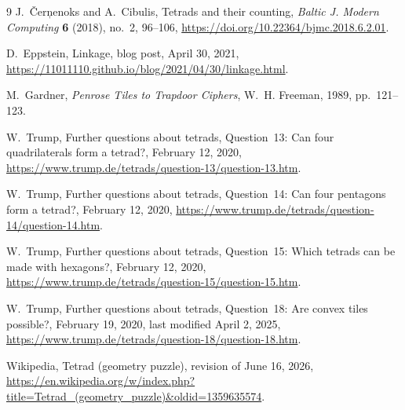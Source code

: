 \documentclass[11pt]{article}
\theoremstyle{definition}
\theoremstyle{remark}
\begin{document}
\begin{thebibliography}{9}
 J.~\v{C}er\c{n}enoks and A.~Cibulis, Tetrads and their
counting, \emph{Baltic J. Modern Computing} \textbf{6} (2018), no.~2,
96--106, \url{https://doi.org/10.22364/bjmc.2018.6.2.01}.

 D.~Eppstein, Linkage, blog post, April 30, 2021,
\url{https://11011110.github.io/blog/2021/04/30/linkage.html}.

 M.~Gardner, \emph{Penrose Tiles to Trapdoor Ciphers},
W.~H. Freeman, 1989, pp.~121--123.

 W.~Trump, Further questions about tetrads, Question~13:
Can four quadrilaterals form a tetrad?, February 12, 2020,
\url{https://www.trump.de/tetrads/question-13/question-13.htm}.

 W.~Trump, Further questions about tetrads, Question~14:
Can four pentagons form a tetrad?, February 12, 2020,
\url{https://www.trump.de/tetrads/question-14/question-14.htm}.

 W.~Trump, Further questions about tetrads, Question~15:
Which tetrads can be made with hexagons?, February 12, 2020,
\url{https://www.trump.de/tetrads/question-15/question-15.htm}.

 W.~Trump, Further questions about tetrads, Question~18:
Are convex tiles possible?, February 19, 2020, last modified April 2, 2025,
\url{https://www.trump.de/tetrads/question-18/question-18.htm}.

 Wikipedia, Tetrad (geometry puzzle), revision of June 16,
2026,
\url{https://en.wikipedia.org/w/index.php?title=Tetrad_(geometry_puzzle)&oldid=1359635574}.
\end{thebibliography}
\end{document}
